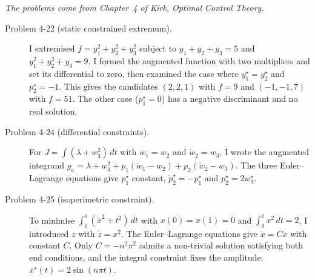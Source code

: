 


\noindent\textit{The problems come from Chapter~4 of Kirk, \emph{Optimal Control Theory}.}

\begin{description}
  \item[Problem 4-22 (static constrained extremum).] I extremised $f=y_1^2+y_2^2+y_3^2$ subject to $y_1+y_2+y_3=5$ and $y_1^2+y_2^2+y_3=9$. I formed the augmented function with two multipliers and set its differential to zero, then examined the case where $y_1^\star=y_2^\star$ and $p_2^\star=-1$. This gives the candidates $(2,2,1)$ with $f=9$ and $(-1,-1,7)$ with $f=51$. The other case ($p_1^\star=0$) has a negative discriminant and no real solution.
  \item[Problem 4-24 (differential constraints).] For $J=\int(\lambda+w_3^2)\,dt$ with $\dot w_1=w_2$ and $\dot w_2=w_3$, I wrote the augmented integrand $g_a=\lambda+w_3^2+p_1(\dot w_1-w_2)+p_2(\dot w_2-w_3)$. The three Euler--Lagrange equations give $p_1^\star$ constant, $\dot p_2^\star=-p_1^\star$ and $p_2^\star=2w_3^\star$.
  \item[Problem 4-25 (isoperimetric constraint).] To minimise $\int_0^1(\dot x^2+t^2)\,dt$ with $x(0)=x(1)=0$ and $\int_0^1 x^2\,dt=2$, I introduced $z$ with $\dot z=x^2$. The Euler--Lagrange equations give $\ddot x=Cx$ with constant $C$. Only $C=-n^2\pi^2$ admits a non-trivial solution satisfying both end conditions, and the integral constraint fixes the amplitude: $x^\star(t)=2\sin(n\pi t)$.
\end{description}

